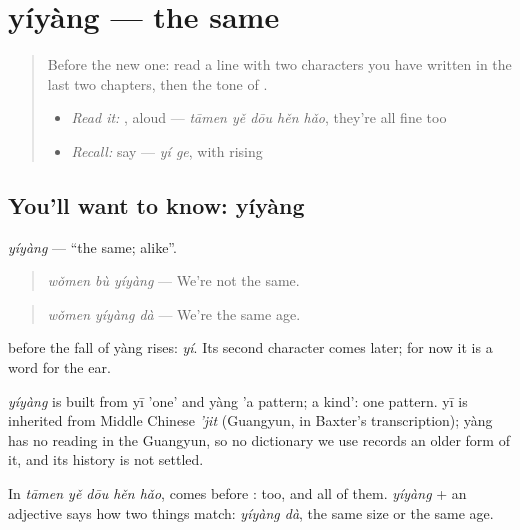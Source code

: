 \section[yíyàng]{yíyàng — the same}

\label{lesson:ZH-C94-yiyang}



\begin{quote}
Before the new one: read a line with two characters you have written in the last two chapters, then the tone of .

\begin{itemize}
\raggedright
  \item \emph{Read it:} , aloud — \emph{tāmen yě dōu hěn hǎo}, they're all fine too
  \item \emph{Recall:} say  — \emph{yí ge}, with  rising
\end{itemize}
\end{quote}

\subsection*{You'll want to know: yíyàng}
\emph{yíyàng} — \textquotedblleft{}the same; alike\textquotedblright{}.

\begin{quote}
\emph{wǒmen bù yíyàng} — We're not the same.
\end{quote}

\begin{quote}
\emph{wǒmen yíyàng dà} — We're the same age.
\end{quote}

 before the fall of yàng rises: \emph{yí}. Its second character comes later; for now it is a word for the ear.

\begin{cousinweb}
\emph{yíyàng} is built from yī 'one' and yàng 'a pattern; a kind': one pattern. yī is inherited from Middle Chinese \emph{'jit} (Guangyun, in Baxter's transcription); yàng has no reading in the Guangyun, so no dictionary we use records an older form of it, and its history is not settled.
\end{cousinweb}

\begin{grammarlens}[title={What you've built}]
In \emph{tāmen yě dōu hěn hǎo},  comes before : too, and all of them. \emph{yíyàng} + an adjective says how two things match: \emph{yíyàng dà}, the same size or the same age.
\end{grammarlens}

